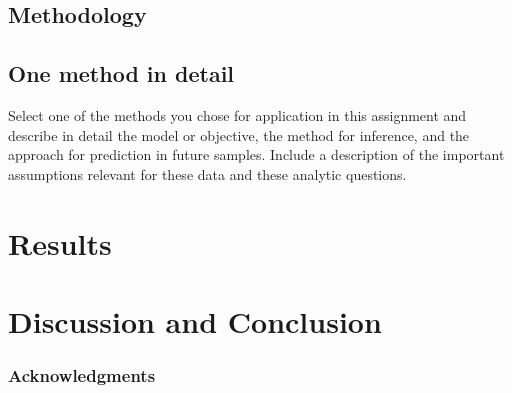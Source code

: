\documentclass{article} %
\begin{document}
\subsection{Methodology}

\subsection{One method in detail}

Select one of the methods you chose for application in this assignment and describe in detail the model or objective, the method for inference, and the approach for prediction in future samples. Include a description of the important assumptions relevant for these data and these analytic questions.

\section{Results}

\section{Discussion and Conclusion}

\subsubsection*{Acknowledgments}


\printbibliography
\end{document}
